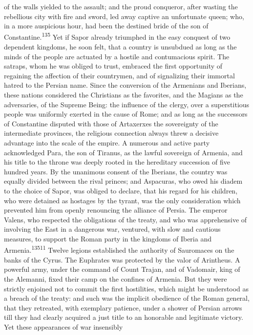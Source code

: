 {{{{{{{{{{{{{{{{{{{{{{{{{{{{{{{{{{{{{{{{{{{{{{{{{{{{{{{{{{{{{{{{{{{{{{{{{{{{{{{{{{{{{{{{{{{{{{{{{{{{{{{{{{{{{{{{{{{{{{{{{{{{{{{{{{{{{{{{{{{{{{{{of the walls yielded to the assault; and the proud conqueror,
after wasting the rebellious city with fire and sword, led away
captive an unfortunate queen; who, in a more auspicious hour, had
been the destined bride of the son of Constantine.\textsuperscript{135} Yet if
Sapor already triumphed in the easy conquest of two dependent
kingdoms, he soon felt, that a country is unsubdued as long as
the minds of the people are actuated by a hostile and
contumacious spirit. The satraps, whom he was obliged to trust,
embraced the first opportunity of regaining the affection of
their countrymen, and of signalizing their immortal hatred to the
Persian name. Since the conversion of the Armenians and Iberians,
these nations considered the Christians as the favorites, and the
Magians as the adversaries, of the Supreme Being: the influence
of the clergy, over a superstitious people was uniformly exerted
in the cause of Rome; and as long as the successors of
Constantine disputed with those of Artaxerxes the sovereignty of
the intermediate provinces, the religious connection always threw
a decisive advantage into the scale of the empire. A numerous and
active party acknowledged Para, the son of Tiranus, as the lawful
sovereign of Armenia, and his title to the throne was deeply
rooted in the hereditary succession of five hundred years. By the
unanimous consent of the Iberians, the country was equally
divided between the rival princes; and Aspacuras, who owed his
diadem to the choice of Sapor, was obliged to declare, that his
regard for his children, who were detained as hostages by the
tyrant, was the only consideration which prevented him from
openly renouncing the alliance of Persia. The emperor Valens, who
respected the obligations of the treaty, and who was apprehensive
of involving the East in a dangerous war, ventured, with slow and
cautious measures, to support the Roman party in the kingdoms of
Iberia and Armenia.\textsuperscript{13511} Twelve legions established the
authority of Sauromaces on the banks of the Cyrus. The Euphrates
was protected by the valor of Arintheus. A powerful army, under
the command of Count Trajan, and of Vadomair, king of the
Alemanni, fixed their camp on the confines of Armenia. But they
were strictly enjoined not to commit the first hostilities, which
might be understood as a breach of the treaty: and such was the
implicit obedience of the Roman general, that they retreated,
with exemplary patience, under a shower of Persian arrows till
they had clearly acquired a just title to an honorable and
legitimate victory. Yet these appearances of war insensibly
}}}}}}}}}}}}}}}}}}}}}}}}}}}}}}}}}}}}}}}}}}}}}}}}}}}}}}}}}}}}}}}}}}}}}}}}}}}}}}}}}}}}}}}}}}}}}}}}}}}}}}}}}}}}}}}}}}}}}}}}}}}}}}}}}}}}}}}}}}}}}}}}
